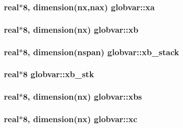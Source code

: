 \subsubsection[{xa}]{\setlength{\rightskip}{0pt plus 5cm}real$\ast$8, dimension({\bf nx},{\bf nax}) globvar\+::xa}\label{namespaceglobvar_a8fc7e5c4a3ef5051faf2730bf96a2dd1}
\hypertarget{namespaceglobvar_af4daba9dc0eb452ca6d91e10550fa072}{}
\subsubsection[{xb}]{\setlength{\rightskip}{0pt plus 5cm}real$\ast$8, dimension({\bf nx}) globvar\+::xb}\label{namespaceglobvar_af4daba9dc0eb452ca6d91e10550fa072}
\hypertarget{namespaceglobvar_ac7d10e840db27451a3d4f7281e998936}{}
\subsubsection[{xb\+\_\+stack}]{\setlength{\rightskip}{0pt plus 5cm}real$\ast$8, dimension({\bf nspan}) globvar\+::xb\+\_\+stack}\label{namespaceglobvar_ac7d10e840db27451a3d4f7281e998936}
\hypertarget{namespaceglobvar_ab9824c9f8dcc0e337df800037acfff86}{}
\subsubsection[{xb\+\_\+stk}]{\setlength{\rightskip}{0pt plus 5cm}real$\ast$8 globvar\+::xb\+\_\+stk}\label{namespaceglobvar_ab9824c9f8dcc0e337df800037acfff86}
\hypertarget{namespaceglobvar_a9ae5763e77ebfcbe371431bd4f1eeb7e}{}
\subsubsection[{xbs}]{\setlength{\rightskip}{0pt plus 5cm}real$\ast$8, dimension({\bf nx}) globvar\+::xbs}\label{namespaceglobvar_a9ae5763e77ebfcbe371431bd4f1eeb7e}
\hypertarget{namespaceglobvar_a69b897237929c1e1095f61f9da69c152}{}
\subsubsection[{xc}]{\setlength{\rightskip}{0pt plus 5cm}real$\ast$8, dimension({\bf nx}) globvar\+::xc}\label{namespaceglobvar_a69b897237929c1e1095f61f9da69c152}
\hypertarget{namespaceglobvar_afe183ce32de3adfc403b0f269a275676}{}
